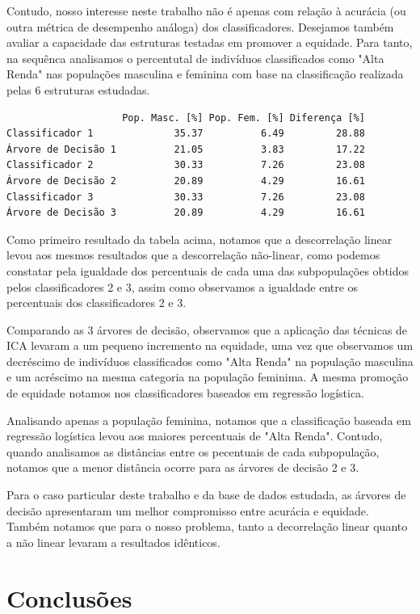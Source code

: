 \documentclass[11pt]{article}
\begin{document}
Contudo, nosso interesse neste trabalho não é apenas com relação à
acurácia (ou outra métrica de desempenho análoga) dos classificadores.
Desejamos também avaliar a capacidade das estruturas testadas em
promover a equidade. Para tanto, na sequênca analisamos o percentutal de
indivíduos classificados como "Alta Renda" nas populações masculina e
feminina com base na classificação realizada pelas 6 estruturas
estudadas.

    
    \begin{verbatim}
                    Pop. Masc. [%] Pop. Fem. [%] Diferença [%]
Classificador 1              35.37          6.49         28.88
Árvore de Decisão 1          21.05          3.83         17.22
Classificador 2              30.33          7.26         23.08
Árvore de Decisão 2          20.89          4.29         16.61
Classificador 3              30.33          7.26         23.08
Árvore de Decisão 3          20.89          4.29         16.61
    \end{verbatim}

    
    Como primeiro resultado da tabela acima, notamos que a descorrelação
linear levou aos mesmos resultados que a descorrelação não-linear, como
podemos constatar pela igualdade dos percentuais de cada uma das
subpopulações obtidos pelos classificadores 2 e 3, assim como observamos
a igualdade entre os percentuais dos classificadores 2 e 3.

Comparando as 3 árvores de decisão, observamos que a aplicação das
técnicas de ICA levaram a um pequeno incremento na equidade, uma vez que
observamos um decréscimo de indivíduos classificados como "Alta Renda"
na população masculina e um acréscimo na mesma categoria na população
feminima. A mesma promoção de equidade notamos nos classificadores
baseados em regressão logística.

Analisando apenas a população feminina, notamos que a classificação
baseada em regressão logística levou aos maiores percentuais de "Alta
Renda". Contudo, quando analisamos as distâncias entre os pecentuais de
cada subpopulação, notamos que a menor distância ocorre para as árvores
de decisão 2 e 3.

Para o caso particular deste trabalho e da base de dados estudada, as
árvores de decisão apresentaram um melhor compromisso entre acurácia e
equidade. Também notamos que para o nosso problema, tanto a decorrelação
linear quanto a não linear levaram a resultados idênticos.

    \section{Conclusões}\label{conclusuxf5es}
\end{document}
